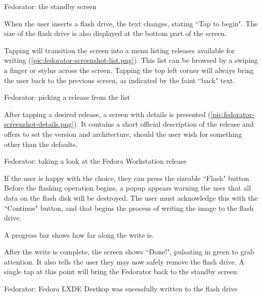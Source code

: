                 {Fedorator: the standby screen}
            
            When the user inserts a flash drive, the text changes, stating ``Tap to begin".  The size of the flash drive is also displayed at the bottom part of the screen.
            
            Tapping will transition the screen into a menu listing releases available for writing (\ref{pic:fedorator-screenshot-list.png}).  This list can be browsed by a swiping a finger or stylus across the screen.  Tapping the top left corner will always bring the user back to the previous screen, as indicated by the faint ``back" text. 
            
                {Fedorator: picking a release from the list}
            
            After tapping a desired release, a screen with details is presented (\ref{pic:fedorator-screenshot-details.png}).  It contains a short official description of the release and offers to set the version and architecture, should the user wish for something other than the defaults.
            
                {Fedorator: taking a look at the Fedora Workstation release}
            
            If the user is happy with the choice, they can press the sizeable ``Flash" button.  Before the flashing operation begins, a popup appears warning the user that all data on the flash disk will be destroyed.  The user must acknowledge this with the ``Continue" button, and that begins the process of writing the image to the flash drive.
            
            
            A progress bar shows how far along the write is.
            
            After the write is complete, the screen shows ``Done!", pulsating in green to grab attention.  It also tells the user they may now safely remove the flash drive.  A single tap at this point will bring the Fedorator back to the standby screen.
            
                {Fedorator: Fedora LXDE Destkop was sucessfully written to the flash drive} %
            
